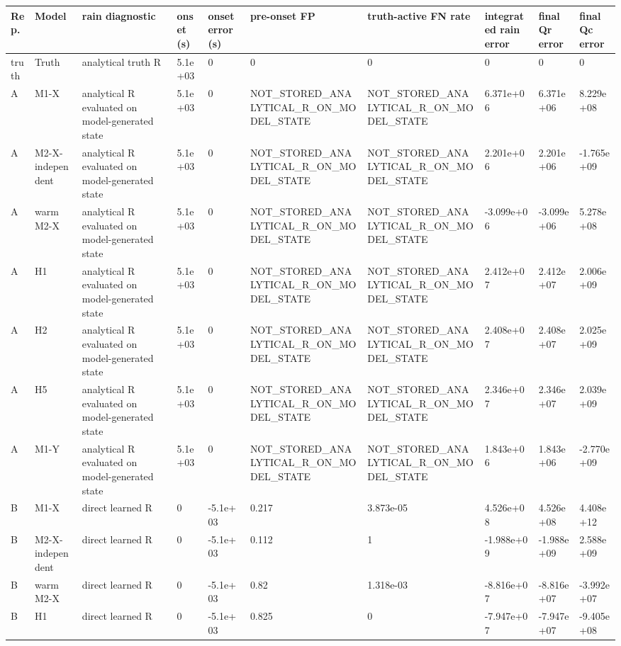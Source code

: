 \begin{tabular}{llllllllll}
\toprule
Rep. & Model & rain diagnostic & onset (s) & onset error (s) & pre-onset FP & truth-active FN rate & integrated rain error & final Qr error & final Qc error \\
\midrule
truth & Truth & analytical truth R & 5.1e+03 & 0 & 0 & 0 & 0 & 0 & 0 \\
A & M1-X & analytical R evaluated on model-generated state & 5.1e+03 & 0 & NOT\_STORED\_ANALYTICAL\_R\_ON\_MODEL\_STATE & NOT\_STORED\_ANALYTICAL\_R\_ON\_MODEL\_STATE & 6.371e+06 & 6.371e+06 & 8.229e+08 \\
A & M2-X-independent & analytical R evaluated on model-generated state & 5.1e+03 & 0 & NOT\_STORED\_ANALYTICAL\_R\_ON\_MODEL\_STATE & NOT\_STORED\_ANALYTICAL\_R\_ON\_MODEL\_STATE & 2.201e+06 & 2.201e+06 & -1.765e+09 \\
A & warm M2-X & analytical R evaluated on model-generated state & 5.1e+03 & 0 & NOT\_STORED\_ANALYTICAL\_R\_ON\_MODEL\_STATE & NOT\_STORED\_ANALYTICAL\_R\_ON\_MODEL\_STATE & -3.099e+06 & -3.099e+06 & 5.278e+08 \\
A & H1 & analytical R evaluated on model-generated state & 5.1e+03 & 0 & NOT\_STORED\_ANALYTICAL\_R\_ON\_MODEL\_STATE & NOT\_STORED\_ANALYTICAL\_R\_ON\_MODEL\_STATE & 2.412e+07 & 2.412e+07 & 2.006e+09 \\
A & H2 & analytical R evaluated on model-generated state & 5.1e+03 & 0 & NOT\_STORED\_ANALYTICAL\_R\_ON\_MODEL\_STATE & NOT\_STORED\_ANALYTICAL\_R\_ON\_MODEL\_STATE & 2.408e+07 & 2.408e+07 & 2.025e+09 \\
A & H5 & analytical R evaluated on model-generated state & 5.1e+03 & 0 & NOT\_STORED\_ANALYTICAL\_R\_ON\_MODEL\_STATE & NOT\_STORED\_ANALYTICAL\_R\_ON\_MODEL\_STATE & 2.346e+07 & 2.346e+07 & 2.039e+09 \\
A & M1-Y & analytical R evaluated on model-generated state & 5.1e+03 & 0 & NOT\_STORED\_ANALYTICAL\_R\_ON\_MODEL\_STATE & NOT\_STORED\_ANALYTICAL\_R\_ON\_MODEL\_STATE & 1.843e+06 & 1.843e+06 & -2.770e+09 \\
B & M1-X & direct learned R & 0 & -5.1e+03 & 0.217 & 3.873e-05 & 4.526e+08 & 4.526e+08 & 4.408e+12 \\
B & M2-X-independent & direct learned R & 0 & -5.1e+03 & 0.112 & 1 & -1.988e+09 & -1.988e+09 & 2.588e+09 \\
B & warm M2-X & direct learned R & 0 & -5.1e+03 & 0.82 & 1.318e-03 & -8.816e+07 & -8.816e+07 & -3.992e+07 \\
B & H1 & direct learned R & 0 & -5.1e+03 & 0.825 & 0 & -7.947e+07 & -7.947e+07 & -9.405e+08 \\

\end{tabular}
